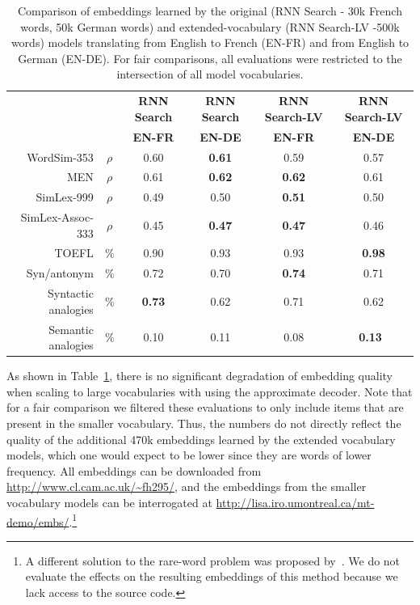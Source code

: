 \begin{table}[t]
\begin{center}
\begin{tabular}{r c | c c c c }
    \multicolumn{2}{c|}{~} &\bf RNN Search &\bf RNN Search & \bf RNN Search-LV  & \bf RNN Search-LV  \\ 
 \multicolumn{2}{c|}{~} &\bf \small EN-FR &\bf \small  EN-DE & \bf  \small EN-FR & \bf \small EN-DE \\ 
\hline
WordSim-353   & \(\rho\) & 0.60 & \bf 0.61 & 0.59 & 0.57  \\
MEN & \(\rho\) & 0.61 & \bf 0.62 & \bf 0.62 & 0.61 \\
SimLex-999 & \(\rho\) & 0.49 & 0.50 & \bf  0.51 & 0.50  \\
SimLex-Assoc-333 & \(\rho\) & 0.45  & \bf 0.47  & \bf 0.47  & 0.46   \\
TOEFL & \(\%\) & 0.90 & 0.93 & 0.93 & \bf 0.98  \\
Syn/antonym & \(\%\) & 0.72 &  0.70 & \bf 0.74 & 0.71 \\
Syntactic analogies & \(\%\) & \bf 0.73 &  0.62 & 0.71 & 0.62\\
Semantic analogies & \(\%\) & 0.10 &  0.11 & 0.08 & \bf 0.13\
\end{tabular}
\caption{Comparison of embeddings learned by the original (RNN Search - 30k French words, 50k German words) and extended-vocabulary (RNN Search-LV -500k words) models translating from English to French (EN-FR) and from English to German (EN-DE). For fair comparisons, all evaluations were restricted to the intersection of all model vocabularies.}
\label{table:ex}
\end{center}
\vspace{-5mm}
\end{table}

As shown in Table~\ref{table:ex}, there is no significant degradation of embedding quality when scaling to large vocabularies with using the approximate decoder. Note that for a fair comparison we filtered these evaluations to only include items that are present in the smaller vocabulary. Thus, the numbers do not directly reflect the quality of the additional 470k embeddings learned by the extended vocabulary models, which one would expect to be lower since they are words of lower frequency. All embeddings can be downloaded from \url{http://www.cl.cam.ac.uk/~fh295/}, and the embeddings from the smaller vocabulary models can be interrogated at \url{http://lisa.iro.umontreal.ca/mt-demo/embs/}.\footnote{A different solution to the rare-word problem was proposed by~\cite{luong2014addressing}. We do not evaluate the effects on the resulting embeddings of this method because we lack access to the source code.} 


